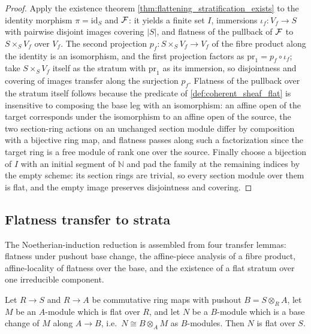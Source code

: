 \begin{proof}
  \leanok
  Apply the existence theorem \cref{thm:flattening_stratification_exists} to
  the identity morphism \(\pi = \mathrm{id}_S\) and \(\mathcal{F}\): it yields a
  finite set \(I\), immersions \(\iota_f : V_f \to S\) with pairwise
  disjoint images covering \(|S|\), and flatness of the pullback of \(\mathcal{F}\)
  to \(S \times_S V_f\) over \(V_f\).  The second projection
  \(p_f : S \times_S V_f \to V_f\) of the fibre product along the identity
  is an isomorphism, and the first projection factors as
  \(\mathrm{pr}_1 = p_f \circ \iota_f\); take \(S \times_S V_f\) itself
  as the stratum with \(\mathrm{pr}_1\) as its immersion, so disjointness
  and covering of images transfer along the surjection \(p_f\).  Flatness of
  the pullback over the stratum itself follows because the predicate of
  \cref{def:coherent_sheaf_flat} is insensitive to composing the base leg
  with an isomorphism: an affine open of the target corresponds under the
  isomorphism to an affine open of the source, the two section-ring actions
  on an unchanged section module differ by composition with a bijective ring
  map, and flatness passes along such a factorization since the target ring
  is a free module of rank one over the source.  Finally choose a bijection
  of \(I\) with an initial segment of \(\mathbb{N}\) and pad the family at
  the remaining indices by the empty scheme: its section rings are trivial,
  so every section module over them is flat, and the empty image preserves
  disjointness and covering.
\end{proof}

\subsection{Flatness transfer to strata}
\label{subsec:flat_transfer_strata}

The Noetherian-induction reduction is assembled from four transfer lemmas:
flatness under pushout base change, the affine-piece analysis of a fibre
product, affine-locality of flatness over the base, and the existence of a
flat stratum over one irreducible component.

\begin{lemma}

  \leanok
  \label{lem:flat_pushout_base_change}
  Let \(R \to S\) and \(R \to A\) be commutative ring maps with pushout
  \(B = S \otimes_R A\), let \(M\) be an \(A\)-module which is flat over
  \(R\), and let \(N\) be a \(B\)-module which is a base change of \(M\)
  along \(A \to B\), i.e.\ \(N \cong B \otimes_A M\) as \(B\)-modules.  Then
  \(N\) is flat over \(S\).
\end{lemma}

